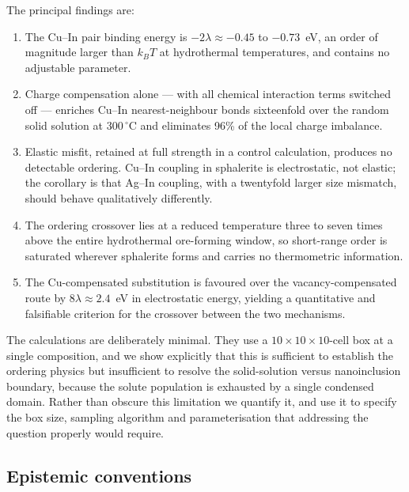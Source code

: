 \documentclass[11pt,a4paper]{article}
\begin{document}
The principal findings are:
\begin{enumerate}\itemsep2pt
\item The Cu--In pair binding energy is $-2\lambda \approx -0.45$ to
      $-0.73$~eV, an order of magnitude larger than $k_BT$ at hydrothermal
      temperatures, and contains no adjustable parameter.
\item Charge compensation alone --- with all chemical interaction terms switched
      off --- enriches Cu--In nearest-neighbour bonds sixteenfold over the
      random solid solution at $300\,^\circ$C and eliminates 96\% of the local
      charge imbalance.
\item Elastic misfit, retained at full strength in a control calculation,
      produces no detectable ordering. Cu--In coupling in sphalerite is
      electrostatic, not elastic; the corollary is that Ag--In coupling, with a
      twentyfold larger size mismatch, should behave qualitatively differently.
\item The ordering crossover lies at a reduced temperature three to seven times
      above the entire hydrothermal ore-forming window, so short-range order is
      saturated wherever sphalerite forms and carries no thermometric
      information.
\item The Cu-compensated substitution is favoured over the vacancy-compensated
      route by $8\lambda \approx 2.4$~eV in electrostatic energy, yielding a
      quantitative and falsifiable criterion for the crossover between the two
      mechanisms.
\end{enumerate}

The calculations are deliberately minimal. They use a $10\times10\times10$-cell
box at a single composition, and we show explicitly that this is sufficient to
establish the ordering physics but insufficient to resolve the solid-solution
versus nanoinclusion boundary, because the solute population is exhausted by a
single condensed domain. Rather than obscure this limitation we quantify it, and
use it to specify the box size, sampling algorithm and parameterisation that
addressing the question properly would require.

\subsection{Epistemic conventions}
\end{document}
